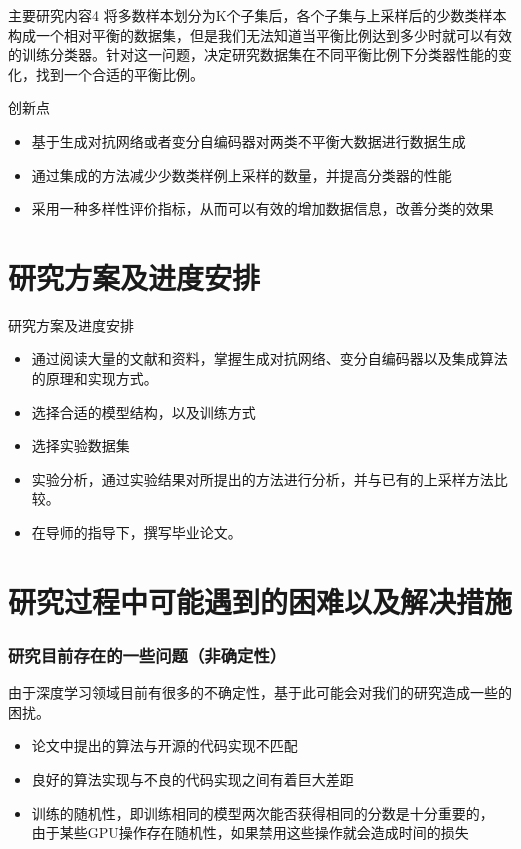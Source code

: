\documentclass{beamer}
\begin{document}
\begin{frame}{主要研究内容4}\pause
    将多数样本划分为K个子集后，各个子集与上采样后的少数类样本构成一个相对平衡的数据集，但是我们无法知道当平衡比例达到多少时就可以有效的训练分类器。针对这一问题，决定研究数据集在不同平衡比例下分类器性能的变化，找到一个合适的平衡比例。
\end{frame}

\begin{frame}{创新点}\pause
    \begin{itemize}
        \item 基于生成对抗网络或者变分自编码器对两类不平衡大数据进行数据生成
        \item 通过集成的方法减少少数类样例上采样的数量，并提高分类器的性能
        \item 采用一种多样性评价指标，从而可以有效的增加数据信息，改善分类的效果
    \end{itemize}
\end{frame}



\section{研究方案及进度安排}
\begin{frame}{研究方案及进度安排}\pause
    \begin{itemize}
        \item 
        通过阅读大量的文献和资料，掌握生成对抗网络、变分自编码器以及集成算法的原理和实现方式。
        \item 
        选择合适的模型结构，以及训练方式
        \item 
        选择实验数据集
        \item 
        实验分析，通过实验结果对所提出的方法进行分析，并与已有的上采样方法比较。
        \item 
        在导师的指导下，撰写毕业论文。
    \end{itemize}
\end{frame}

\section{研究过程中可能遇到的困难以及解决措施}

\begin{frame}[c]\frametitle{研究目前存在的一些问题（非确定性）}
    由于深度学习领域目前有很多的不确定性，基于此可能会对我们的研究造成一些的困扰。
    \begin{itemize}
        \item 论文中提出的算法与开源的代码实现不匹配
        \item 良好的算法实现与不良的代码实现之间有着巨大差距
        \item 训练的随机性，即训练相同的模型两次能否获得相同的分数是十分重要的，
        由于某些GPU操作存在随机性，如果禁用这些操作就会造成时间的损失
    \end{itemize}
\end{frame}
\end{document}
